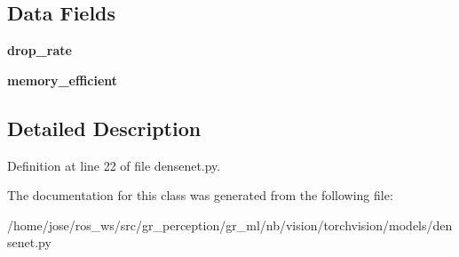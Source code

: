 \subsection*{Data Fields}
\begin{DoxyCompactItemize}
\item 
\mbox{\label{classtorchvision_1_1models_1_1densenet_1_1__DenseLayer_a75a984035b2fbbea946b4537b5246d70}} 
{\bfseries drop\+\_\+rate}
\item 
\mbox{\label{classtorchvision_1_1models_1_1densenet_1_1__DenseLayer_a6bd2268289a74a6250fe5b9d608446f7}} 
{\bfseries memory\+\_\+efficient}
\end{DoxyCompactItemize}


\subsection{Detailed Description}


Definition at line 22 of file densenet.\+py.



The documentation for this class was generated from the following file\+:\begin{DoxyCompactItemize}
\item 
/home/jose/ros\+\_\+ws/src/gr\+\_\+perception/gr\+\_\+ml/nb/vision/torchvision/models/densenet.\+py\end{DoxyCompactItemize}
